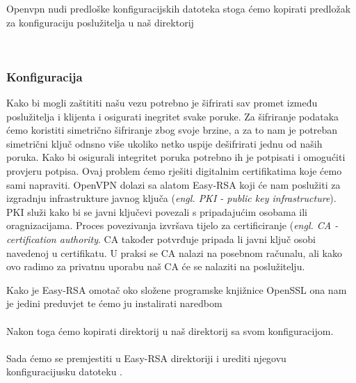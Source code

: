     \noindent
    Openvpn nudi predloške konfiguracijskih datoteka stoga ćemo kopirati
    predložak za konfiguraciju poslužitelja u naš direktorij

    \noindent
     \\

    \subsubsection{Konfiguracija}
        Kako bi mogli zaštititi našu vezu potrebno je šifrirati sav promet
        između poslužitelja i klijenta i osigurati inegritet svake poruke.
        Za šifriranje podataka ćemo koristiti simetrično šifriranje zbog svoje
        brzine, a za to nam je potreban simetrični ključ odnsno više ukoliko
        netko uspije dešifrirati jednu od naših poruka. Kako bi osigurali
        integritet poruka potrebno ih je potpisati i omogućiti provjeru
        potpisa. Ovaj problem ćemo rješiti digitalnim certifikatima koje ćemo
        sami napraviti. OpenVPN dolazi sa alatom Easy-RSA koji će nam poslužiti za izgradnju
        infrastrukture javnog ključa (\textit{engl. PKI - public key
        infrastructure}). PKI služi kako bi se javni ključevi povezali s
        pripadajućim osobama ili oragnizacijama. Proces povezivanja izvršava
        tijelo za certificiranje (\textit{engl. CA - certification authority}.
        CA također potvrđuje pripada li javni ključ osobi navedenoj u
        certifikatu. U praksi se CA nalazi na posebnom računalu, ali kako ovo
        radimo za privatnu uporabu naš CA će se nalaziti na poslužitelju.

        Kako je Easy-RSA omotač oko složene programske knjižnice OpenSSL ona
        nam je jedini preduvjet te ćemo ju instalirati naredbom \\

        \noindent
         \\

        Nakon toga ćemo kopirati  direktorij u naš direktorij sa svom
        konfiguracijom. \\

        \noindent
         \\

        Sada ćemo se premjestiti u Easy-RSA direktoriji i urediti njegovu
        konfiguracijusku datoteku . \\

